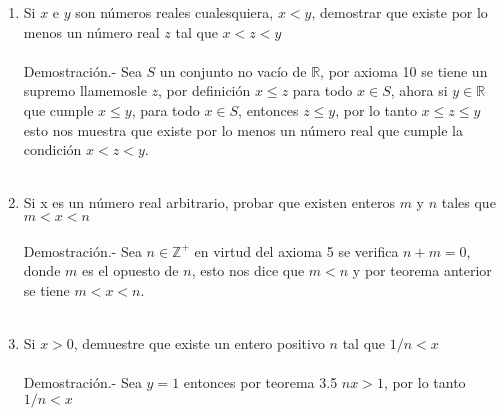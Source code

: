 \begin{enumerate}
\item Si $x$ e $y$ son números reales cualesquiera, $x<y$, demostrar que existe por lo menos un número real $z$ tal que $x<z<y$\\\\
Demostración.- \; Sea $S$ un conjunto no vacío de $\mathbb{R}$, por axioma 10 se tiene un supremo llamemosle $z$, por definición $x\leq z$ para todo $x\in S$, ahora si $y\in \mathbb{R}$ \; que cumple $x\leq y$, para todo $x\in S$, entonces $z\leq y$, por lo tanto $x\leq z \leq y$ esto  nos muestra que existe por lo menos un número real que cumple la condición $x<z<y$. \\\\

\item Si x es un número real arbitrario, probar que existen enteros $m$ y $n$ tales que $m<x<n$\\\\
Demostración.- \;  Sea $n\in \mathbb{Z}^+$ en virtud del axioma 5 se verifica $n+m=0$, donde $m$ es el opuesto de $n$, esto nos dice que $m<n$ y por teorema anterior se tiene $m<x<n$.\\\\

\item Si $x>0$, demuestre que existe un entero positivo $n$ tal que $1/n<x$\\\\
Demostración.- \; Sea $y=1$ entonces por teorema 3.5 \; $nx>1$, por lo tanto $1/n<x$ \\\\


\end{enumerate}
